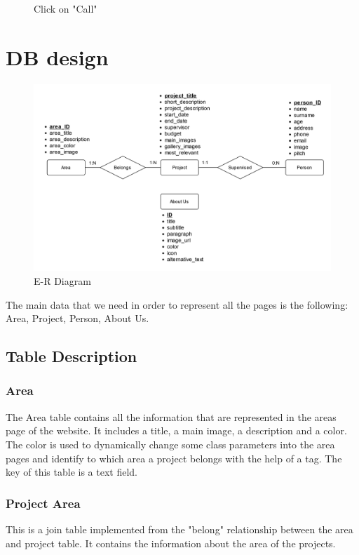 \documentclass[11pt, letterpaper]{article}
\begin{document}
\begin{figure}[H]
\begin{minipage}[b]{0.4\textwidth}
    \caption{Click on "Call"}
    \label{fig:scenario4_12}
  \end{minipage}
\end{figure}



\section{DB design}
\begin{figure}[H]
    \centering
    \includegraphics[width=15cm]{images/Hyper_Design-DB E-R.png}
    \caption{E-R Diagram}
    \label{fig:ER_diagram}
\end{figure}

The main data that we need in order to represent all the pages is the following: Area, Project, Person, About Us.

\subsection{Table Description}
\subsubsection*{Area}
The Area table contains all the information that are represented in the areas page of the website. It includes a title, a main image, a description and a color. The color is used to dynamically change some class parameters into the area pages and identify to which area a project belongs with the help of a tag. The key of this table is a text field.

\subsubsection{Project Area}
This is a join table implemented from the "belong" relationship between the area and project table. It contains the information about the area of the projects.
\end{document}
